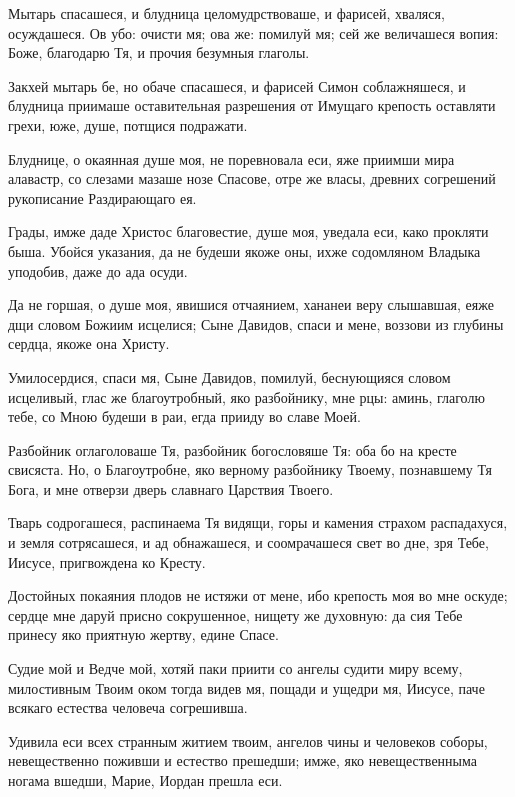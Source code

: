 Мытарь спасашеся, и блудница целомудрствоваше, и фарисей, хваляся, осуждашеся. Ов убо: очисти мя; ова же: помилуй мя; сей же величашеся вопия: Боже, благодарю Тя, и прочия безумныя глаголы.

Закхей мытарь бе, но обаче спасашеся, и фарисей Симон соблажняшеся, и блудница приимаше оставительная разрешения от Имущаго крепость оставляти грехи, юже, душе, потщися подражати.

Блуднице, о окаянная душе моя, не поревновала еси, яже приимши мира алавастр, со слезами мазаше нозе Спасове, отре же власы, древних согрешений рукописание Раздирающаго ея.

Грады, имже даде Христос благовестие, душе моя, уведала еси, како прокляти быша. Убойся указания, да не будеши якоже оны, ихже содомляном Владыка уподобив, даже до ада осуди.

Да не горшая, о душе моя, явишися отчаянием, хананеи веру слышавшая, еяже дщи словом Божиим исцелися; Сыне Давидов, спаси и мене, воззови из глубины сердца, якоже она Христу.

Умилосердися, спаси мя, Сыне Давидов, помилуй, беснующияся словом исцеливый, глас же благоутробный, яко разбойнику, мне рцы: аминь, глаголю тебе, со Мною будеши в раи, егда прииду во славе Моей.

Разбойник оглаголоваше Тя, разбойник богословяше Тя: оба бо на кресте свисяста. Но, о Благоутробне, яко верному разбойнику Твоему, познавшему Тя Бога, и мне отверзи дверь славнаго Царствия Твоего.

Тварь содрогашеся, распинаема Тя видящи, горы и камения страхом распадахуся, и земля сотрясашеся, и ад обнажашеся, и соомрачашеся свет во дне, зря Тебе, Иисусе, пригвождена ко Кресту.

Достойных покаяния плодов не истяжи от мене, ибо крепость моя во мне оскуде; сердце мне даруй присно сокрушенное, нищету же духовную: да сия Тебе принесу яко приятную жертву, едине Спасе.

Судие мой и Ведче мой, хотяй паки приити со ангелы судити миру всему, милостивным Твоим оком тогда видев мя, пощади и ущедри мя, Иисусе, паче всякаго естества человеча согрешивша.


Удивила еси всех странным житием твоим, ангелов чины и человеков соборы, невещественно поживши и естество прешедши; имже, яко невещественныма ногама вшедши, Марие, Иордан прешла еси.


